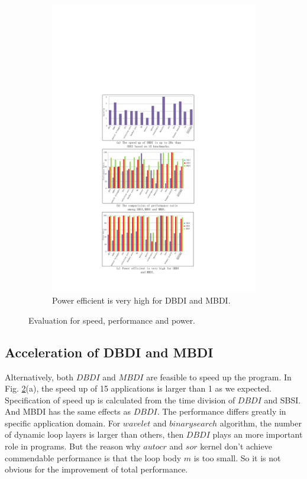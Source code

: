 \documentclass[10pt, conference, compsocconf]{IEEEtran}
\begin{document}
\begin{figure}[t!]
\begin{subfigure}[b]{0.41\textwidth}
		\includegraphics[width=\textwidth]{fi/result_3.pdf}
		\caption{Power efficient is very high for DBDI and MBDI.}
		\label{fig:c}
	\end{subfigure}
	\caption{Evaluation for speed, performance and power.}
	\label{fig_result}
\end{figure}

\subsection{Acceleration of DBDI and MBDI}
Alternatively, both $DBDI$ and $MBDI$ are feasible to speed up the program. In Fig. \ref{fig_result}(a), the speed up of 15 applications is larger than 1 as we expected. Specification of speed up is calculated from the time division of $DBDI$ and SBSI. And MBDI has the same effects as $DBDI$. The performance differs greatly in specific application domain. For $wavelet$ and $binary search$ algorithm, the number of dynamic loop layers is larger than others, then $DBDI$ plays an more important role in programs. But the reason why $autocr$ and $sor$ kernel don't achieve commendable performance is that the loop body $m$ is too small. So it is not obvious for the improvement of total performance.
\end{document}
